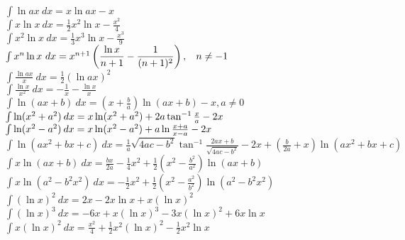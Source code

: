 \documentclass[10pt,landscape,a4paper]{article}
\begin{document}
\begin{multicols*}{3}
$
\int \ln ax\  dx = x \ln ax - x 
$\\

$
\int x \ln x \ dx = \frac{1}{2} x^2 \ln x-\frac{x^2}{4}
$\\

$
\int x^2 \ln x \ dx = \frac{1}{3} x^3 \ln x-\frac{x^3}{9}
$\\

$
\int x^n \ln x\ dx = x^{n+1}\left( \dfrac{\ln x}{n+1}-\dfrac{1}{(n+1)^2}\right),\hspace{2ex} n\neq -1
$\\


$
\int \frac{\ln ax}{x}\ dx = \frac{1}{2}\left ( \ln ax \right)^2 
$\\

$
\int \frac{\ln x}{x^2}\ dx = -\frac{1}{x}-\frac{\ln x}{x}
$\\

$
\int \ln (ax + b) \ dx = \left ( x + \frac{b}{a} \right) \ln (ax+b) - x , a\ne 0
$\\

$
\int \ln  ( x^2 + a^2 )\hspace{.5ex} {dx} = x \ln (x^2 + a^2  ) +2a\tan^{-1} \frac{x}{a} - 2x 
$\\

$
\int \ln  ( x^2 - a^2 )\hspace{.5ex} {dx} = x \ln (x^2 - a^2  ) +a\ln \frac{x+a}{x-a} - 2x 
$\\

$
\int \ln \left ( ax^2 + bx + c\right) \ dx  = \frac{1}{a}\sqrt{4ac-b^2}\tan^{-1}\frac{2ax+b}{\sqrt{4ac-b^2}}
-2x + \left( \frac{b}{2a}+x \right )\ln \left (ax^2+bx+c \right) 
$\\

$
\int x \ln (ax + b)\ dx = \frac{bx}{2a}-\frac{1}{4}x^2 
+\frac{1}{2}\left(x^2-\frac{b^2}{a^2}\right)\ln (ax+b) 
$\\

$
\int x \ln \left ( a^2 - b^2 x^2 \right )\ dx = -\frac{1}{2}x^2+ 
\frac{1}{2}\left( x^2 - \frac{a^2}{b^2} \right ) \ln \left (a^2 -b^2 x^2 \right) 
$\\

$
\int (\ln x)^2\ dx = 2x - 2x \ln x + x (\ln x)^2
$\\


$
\int (\ln x)^3\ dx = -6 x+x (\ln x)^3-3 x (\ln x)^2+6 x \ln x
$\\
 
 
$
\int x (\ln x)^2\ dx = \frac{x^2}{4}+\frac{1}{2} x^2 (\ln x)^2-\frac{1}{2} x^2 \ln x
$\\


\end{multicols*}
\end{document}

